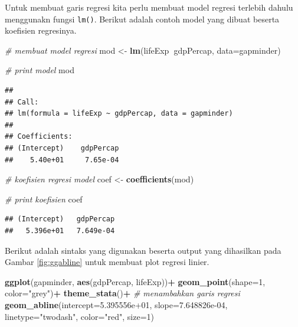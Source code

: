 \documentclass[]{book}
\newenvironment{Shaded}{\begin{snugshade}}{\end{snugshade}}
\newcommand{\KeywordTok}[1]{\textcolor[rgb]{0.13,0.29,0.53}{\textbf{#1}}}
\newcommand{\DataTypeTok}[1]{\textcolor[rgb]{0.13,0.29,0.53}{#1}}
\newcommand{\DecValTok}[1]{\textcolor[rgb]{0.00,0.00,0.81}{#1}}
\newcommand{\FloatTok}[1]{\textcolor[rgb]{0.00,0.00,0.81}{#1}}
\newcommand{\StringTok}[1]{\textcolor[rgb]{0.31,0.60,0.02}{#1}}
\newcommand{\CommentTok}[1]{\textcolor[rgb]{0.56,0.35,0.01}{\textit{#1}}}
\newcommand{\OperatorTok}[1]{\textcolor[rgb]{0.81,0.36,0.00}{\textbf{#1}}}
\newcommand{\NormalTok}[1]{#1}
\begin{document}
Untuk membuat garis regresi kita perlu membuat model regresi terlebih
dahulu menggunakn fungsi \texttt{lm()}. Berikut adalah contoh model yang
dibuat beserta koefisien regresinya.

\begin{Shaded}
\begin{Highlighting}[]
\CommentTok{# membuat model regresi}
\NormalTok{mod <-}\StringTok{ }\KeywordTok{lm}\NormalTok{(lifeExp}\OperatorTok{~}\NormalTok{gdpPercap, }\DataTypeTok{data=}\NormalTok{gapminder)}

\CommentTok{# print model}
\NormalTok{mod}
\end{Highlighting}
\end{Shaded}

\begin{verbatim}
## 
## Call:
## lm(formula = lifeExp ~ gdpPercap, data = gapminder)
## 
## Coefficients:
## (Intercept)    gdpPercap  
##    5.40e+01     7.65e-04
\end{verbatim}

\begin{Shaded}
\begin{Highlighting}[]
\CommentTok{# koefisien regresi model}
\NormalTok{coef <-}\StringTok{ }\KeywordTok{coefficients}\NormalTok{(mod)}

\CommentTok{# print koefisien}
\NormalTok{coef}
\end{Highlighting}
\end{Shaded}

\begin{verbatim}
## (Intercept)   gdpPercap 
##   5.396e+01   7.649e-04
\end{verbatim}

Berikut adalah sintaks yang digunakan beserta output yang dihasilkan
pada Gambar \ref{fig:ggabline} untuk membuat plot regresi linier.

\begin{Shaded}
\begin{Highlighting}[]
\KeywordTok{ggplot}\NormalTok{(gapminder, }\KeywordTok{aes}\NormalTok{(gdpPercap, lifeExp))}\OperatorTok{+}
\StringTok{  }\KeywordTok{geom_point}\NormalTok{(}\DataTypeTok{shape=}\DecValTok{1}\NormalTok{, }\DataTypeTok{color=}\StringTok{"grey"}\NormalTok{)}\OperatorTok{+}
\StringTok{  }\KeywordTok{theme_stata}\NormalTok{()}\OperatorTok{+}
\StringTok{  }\CommentTok{# menambahkan garis regresi}
\StringTok{  }\KeywordTok{geom_abline}\NormalTok{(}\DataTypeTok{intercept=}\FloatTok{5.395556e+01}\NormalTok{,}
         \DataTypeTok{slope=}\FloatTok{7.648826e-04}\NormalTok{,}
         \DataTypeTok{linetype=}\StringTok{"twodash"}\NormalTok{,}
             \DataTypeTok{color=}\StringTok{"red"}\NormalTok{,}
             \DataTypeTok{size=}\DecValTok{1}\NormalTok{)}
\end{Highlighting}
\end{Shaded}
\end{document}
